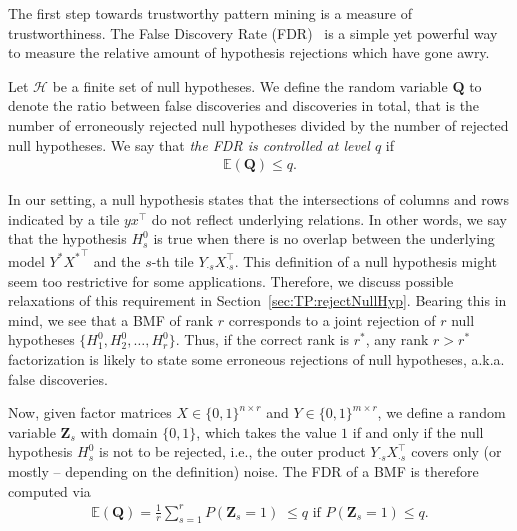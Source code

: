 The first step towards trustworthy pattern mining is a measure of trustworthiness. 
The False Discovery Rate (FDR)~\citep{benjamini1995controlling} is a simple yet powerful way to measure the relative amount of hypothesis rejections which have gone awry.
\begin{definition}[FDR]
Let $\mathcal{H}$ be a finite set of null hypotheses. We define the random variable $\mathbf{Q}$ to denote the ratio between false discoveries and discoveries in total, that is the number of erroneously rejected null hypotheses divided by the number of rejected null hypotheses. We say that \emph{the FDR is controlled at level $q$} if
\begin{align*}
\mathbb{E}\left(\mathbf{Q}\right)\leq q.
\end{align*}
\end{definition}
In our setting, a null hypothesis states that the intersections of columns and rows indicated by a tile $yx^\top$ do not reflect underlying relations. In other words, we say that the hypothesis $H_s^0$ is true when there is no overlap between the underlying model $Y^*{X^*}^\top$ and the $s$-th tile $Y_{\cdot s}X_{\cdot s}^\top$. This definition of a null hypothesis might seem too restrictive for some applications. Therefore, we discuss possible relaxations of this requirement in Section~\ref{sec:TP:rejectNullHyp}. 
Bearing this in mind, we see that a BMF of rank $r$ corresponds to a joint rejection of $r$ null hypotheses $\{H_1^0,H_2^0,\dots,H_r^0\}$. 
Thus, if the correct rank is $r^*$, any rank $r>r^*$ factorization is likely to state some erroneous rejections of null hypotheses, a.k.a. false discoveries. 

Now, given factor matrices $X\in \{0,1\}^{n\times r}$ and $Y\in\{0,1\}^{m\times r}$, we define a random variable $\mathbf{Z}_s$ with domain $\{0,1\}$, which takes the value $1$ if and only if the null hypothesis $H_s^0$ is not to be rejected, i.e., the outer product $Y_{\cdot s}X_{\cdot s}^\top $ covers only (or mostly -- depending on the definition) noise. The FDR of a BMF is therefore computed via
\begin{align}
\mathbb{E}\left(\mathbf{Q}\right) =  \frac{1}{r}\sum_{s=1}^rP(\mathbf{Z}_s=1)\;\leq q \text{ if } P(\mathbf{Z}_s=1)\leq q.\label{eq:FDRZ}
\end{align}
